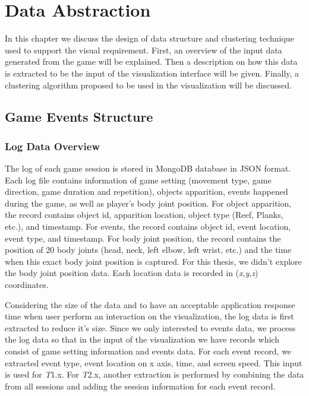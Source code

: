 \chapter{Data Abstraction}

In this chapter we discuss the design of data structure and clustering technique used to support the visual requirement. First, an overview of the input data generated from the game will be explained. Then a description on how this data is extracted to be the input of the visualization interface will be given. Finally, a clustering algorithm proposed to be used in the visualization will be discussed.

\section{Game Events Structure}
\subsection{Log Data Overview}
The log of each game session is stored in MongoDB database in JSON format. Each log file contains information of game setting (movement type, game direction, game duration and repetition), objects apparition, events happened during the game, as well as player's body joint position. For object apparition, the record contains object id, apparition location, object type (Reef, Planks, etc.), and timestamp. For events, the record contains object id, event location, event type, and timestamp. For body joint position, the record contains the position of 20 body joints (head, neck, left elbow, left wrist, etc.) and the time when this exact body joint position is captured. For this thesis, we didn't explore the body joint position data. Each location data is recorded in (\textit{x},\textit{y},\textit{z}) coordinates.

Considering the size of the data and to have an acceptable application response time when user perform an interaction on the visualization, the log data is first extracted to reduce it's size. Since we only interested to events data, we process the log data so that in the input of the visualization we have records which consist of game setting information and events data. For each event record, we extracted event type, event location on x axis, time, and screen speed. This input is used for \textit{T}1.x. For \textit{T}2.x, another extraction is performed by combining the data from all sessions and adding the session information for each event record.
